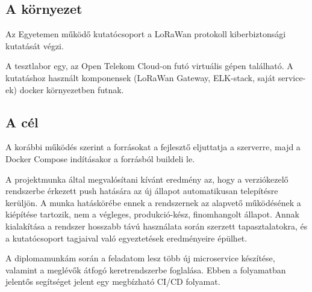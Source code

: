 
\subsection{A környezet}
Az Egyetemen működő kutatócsoport a LoRaWan protokoll kiberbiztonsági kutatását végzi.

A tesztlabor egy, az Open Telekom Cloud-on futó virtuális gépen található. A kutatáshoz használt komponensek (LoRaWan Gateway, ELK-stack, saját service-ek) docker környezetben futnak.



\subsection{A cél}

A korábbi működés szerint a forrásokat a fejlesztő eljuttatja a szerverre, majd a Docker Compose indításakor a forrásból buildeli le.

A projektmunka által megvalósítani kívánt eredmény az, hogy a verziókezelő rendszerbe érkezett push hatására az új állapot automatikusan telepítésre kerüljön. A munka hatáskörébe ennek a rendszernek az alapvető működésének a kiépítése tartozik, nem a végleges, produkció-kész, finomhangolt állapot. Annak kialakítása a rendszer hosszabb távú használata során szerzett tapasztalatokra, és a kutatócsoport tagjaival való egyeztetések eredményeire épülhet.

A diplomamunkám során a feladatom lesz több új microservice készítése, valamint a meglévők átfogó keretrendszerbe foglalása. Ebben a folyamatban jelentős segítséget jelent egy megbízható CI/CD folyamat.


